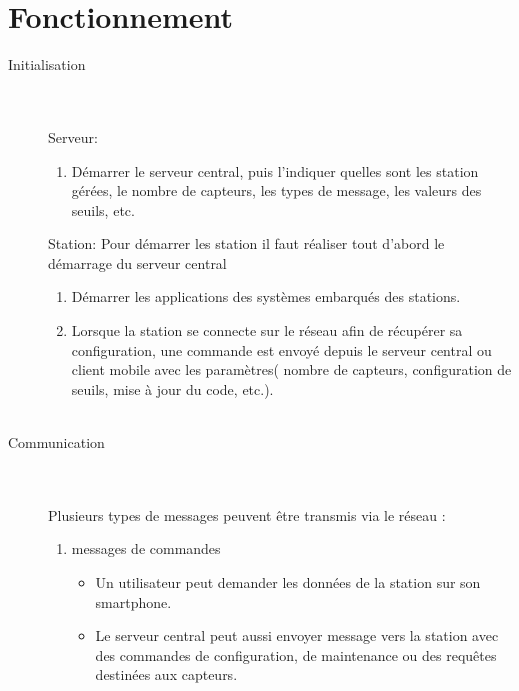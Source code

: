 \documentclass [a4paper] {report}
\begin{document}
\section{Fonctionnement}

\begin{description}

\item[Initialisation]\hfill\\
	\\Serveur:
	\begin{enumerate}
	\item Démarrer le serveur central, puis l'indiquer quelles sont les station gérées, le nombre de capteurs, les types de message, les valeurs des seuils, etc.\\
	\end{enumerate}
	Station: 
	Pour démarrer les station il faut réaliser tout d'abord le démarrage du serveur central
	\begin{enumerate}
	\item Démarrer les applications des systèmes embarqués des stations.
	\item Lorsque la station se connecte sur le réseau afin de récupérer sa configuration, une commande est envoyé depuis le serveur central ou client mobile avec les paramètres( nombre de capteurs, configuration de seuils, mise à jour du code, etc.).\\\\
	\end{enumerate}

\item [Communication]\hfill\\
	\\Plusieurs types de messages peuvent être transmis via le réseau :\\
	\begin{enumerate}
	\item messages de commandes \\
		\begin{itemize}
		\item Un utilisateur peut demander les données de la station sur son smartphone.\\
		\item Le serveur central peut aussi envoyer message vers la station avec des commandes de configuration, de maintenance ou des requêtes destinées aux capteurs.\\
		\end{itemize}
	

\end{enumerate}
\end{description}
\end{document}
